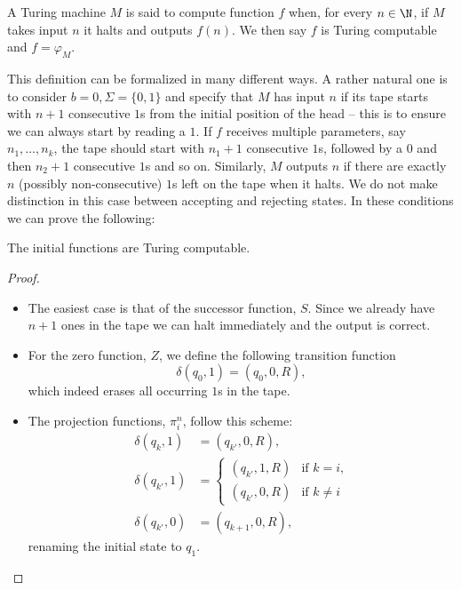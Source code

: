 \documentclass[../main.tex]{memoir}
\begin{document}
\begin{definition}
A Turing machine $M$ is said to compute function $f$ when, for every $n \in \N$, if $M$ takes input $n$ it halts and outputs $f(n)$. We then say $f$ is Turing computable and $f = \varphi_M$.
\end{definition}

This definition can be formalized in many different ways. A rather natural one is to consider $b = 0, \Sigma = \{0, 1\}$ and specify that $M$ has input $n$ if its tape starts with $n + 1$ consecutive $1$s from the initial position of the head -- this is to ensure we can always start by reading a $1$. If $f$ receives multiple parameters, say $n_1, \ldots, n_k$, the tape should start with $n_1 + 1$ consecutive $1$s, followed by a $0$ and then $n_2 + 1$ consecutive $1$s and so on. Similarly, $M$ outputs $n$ if there are exactly $n$ (possibly non-consecutive) $1$s left on the tape when it halts. We do not make distinction in this case between accepting and rejecting states. In these conditions we can prove the following:

\begin{theorem}
  The initial functions are Turing computable.
\end{theorem}
\begin{proof}
  \begin{itemize}
  \item The easiest case is that of the successor function, $S$. Since we already have $n + 1$ ones in the tape we can halt immediately and the output is correct.
  \item For the zero function, $Z$, we define the following transition function
    \[
      \delta(q_0, 1) = (q_0, 0, R),
    \]
    which indeed erases all occurring $1$s in the tape.
  \item The projection functions, $\pi_i^n$, follow this scheme:
    \begin{align*}
      \delta(q_k, 1) & = (q_{k'}, 0, R), \\
      \delta(q_{k'}, 1) & = \left\{
        \begin{array}{lr}
          (q_{k'}, 1, R) & \text{if } k = i \text{,} \\
          (q_{k'}, 0, R) & \text{if } k \neq i
        \end{array} \right.\\
      \delta(q_{k'}, 0) & = (q_{k + 1}, 0, R),
    \end{align*}
    renaming the initial state to $q_1$.
  \end{itemize}
\end{proof}
\end{document}
